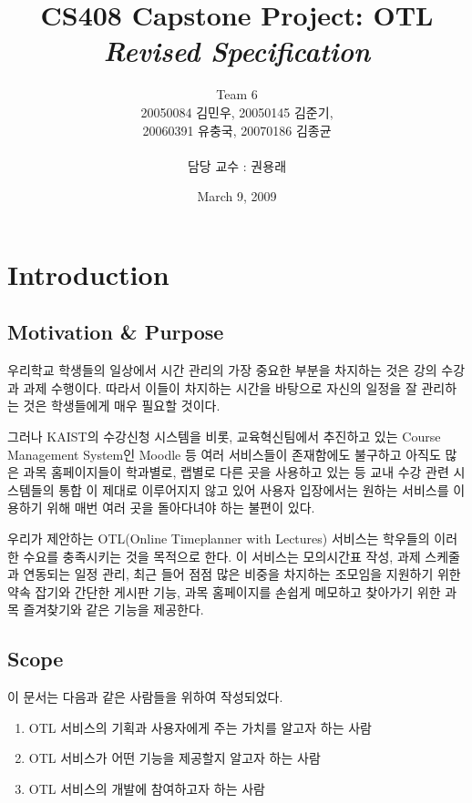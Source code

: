 \documentclass[a4paper,titlepage]{article}
\title{\textbf{CS408 Capstone Project: OTL}\\ \textit{Revised Specification}}
\author{Team 6\\20050084 김민우, 20050145 김준기,\\20060391 유충국, 20070186 김종균\\\\담당 교수 : 권용래}
\begin{document}
\date{March 9, 2009}
\maketitle

\tableofcontents
\listoffigures

\pagebreak

\section{Introduction}
\subsection{Motivation \& Purpose}
우리학교 학생들의 일상에서 시간 관리의 가장 중요한 부분을 차지하는 것은 강의 수강과 과제 수행이다.
따라서 이들이 차지하는 시간을 바탕으로 자신의 일정을 잘 관리하는 것은 학생들에게 매우 필요할 것이다. 

그러나 KAIST의 수강신청 시스템을 비롯, 교육혁신팀에서 추진하고 있는 Course Management System인 Moodle 등 여러 서비스들이 존재함에도 불구하고 아직도 많은 과목 
홈페이지들이 학과별로, 랩별로 다른 곳을 사용하고 있는 등 교내 수강 관련 시스템들의 통합 이 제대로 이루어지지 않고 있어 사용자 입장에서는 원하는 서비스를 이용하기 위해 매번 여러 곳을 돌아다녀야 하는 불편이 있다. 

우리가 제안하는 OTL(Online Timeplanner with Lectures) 서비스는 학우들의 이러한 수요를 충족시키는 것을 목적으로 한다.
이 서비스는 모의시간표 작성, 과제 스케줄과 연동되는 일정 관리, 최근 들어 점점 많은 비중을 차지하는 조모임을 지원하기 위한 약속 잡기와 간단한 게시판 기능, 과목 홈페이지를 손쉽게 메모하고 찾아가기 위한 과목 즐겨찾기와 같은 기능을 제공한다.

\subsection{Scope}
이 문서는 다음과 같은 사람들을 위하여 작성되었다.
\begin{enumerate}
	\item OTL 서비스의 기획과 사용자에게 주는 가치를 알고자 하는 사람
	\item OTL 서비스가 어떤 기능을 제공할지 알고자 하는 사람
	\item OTL 서비스의 개발에 참여하고자 하는 사람
\end{enumerate}
\end{document}
